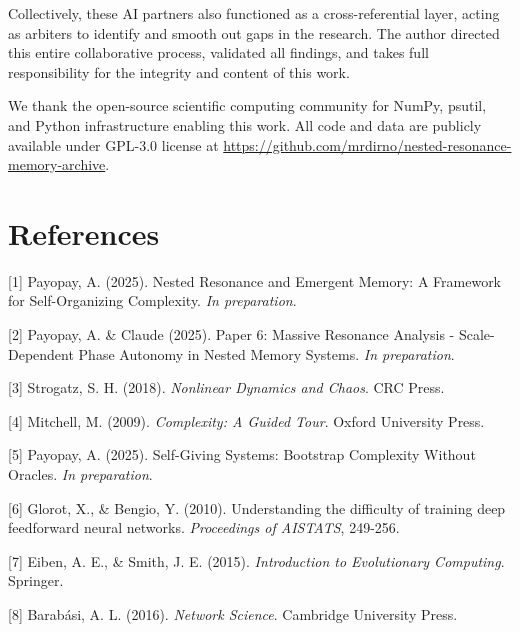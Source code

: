 \documentclass[11pt]{article}
\begin{document}
Collectively, these AI partners also functioned as a cross-referential layer, acting as arbiters to identify and smooth out gaps in the research. The author directed this entire collaborative process, validated all findings, and takes full responsibility for the integrity and content of this work.

We thank the open-source scientific computing community for NumPy, psutil, and Python infrastructure enabling this work. All code and data are publicly available under GPL-3.0 license at \url{https://github.com/mrdirno/nested-resonance-memory-archive}.

\section*{References}

[1] Payopay, A. (2025). Nested Resonance and Emergent Memory: A Framework for Self-Organizing Complexity. \emph{In preparation}.

[2] Payopay, A. \& Claude (2025). Paper 6: Massive Resonance Analysis - Scale-Dependent Phase Autonomy in Nested Memory Systems. \emph{In preparation}.

[3] Strogatz, S. H. (2018). \emph{Nonlinear Dynamics and Chaos}. CRC Press.

[4] Mitchell, M. (2009). \emph{Complexity: A Guided Tour}. Oxford University Press.

[5] Payopay, A. (2025). Self-Giving Systems: Bootstrap Complexity Without Oracles. \emph{In preparation}.

[6] Glorot, X., \& Bengio, Y. (2010). Understanding the difficulty of training deep feedforward neural networks. \emph{Proceedings of AISTATS}, 249-256.

[7] Eiben, A. E., \& Smith, J. E. (2015). \emph{Introduction to Evolutionary Computing}. Springer.

[8] Barab\'asi, A. L. (2016). \emph{Network Science}. Cambridge University Press.
\end{document}

